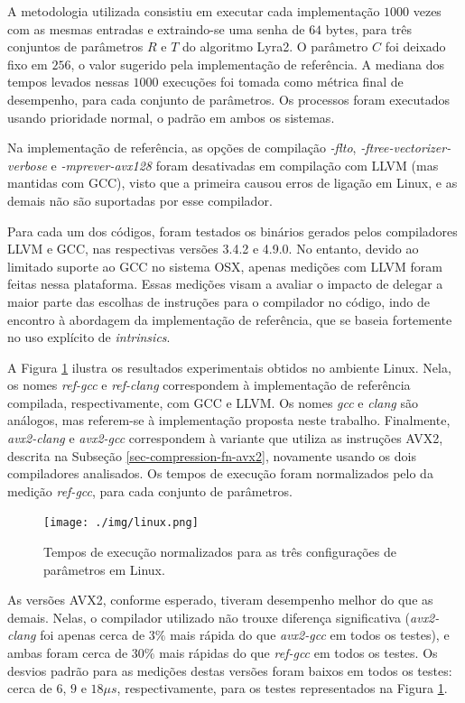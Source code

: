 \documentclass{article}
\begin{document}
A metodologia utilizada consistiu em executar cada implementação
$1000$ vezes com as mesmas entradas e extraindo-se uma senha de $64$
bytes, para três conjuntos de parâmetros $R$ e $T$ do algoritmo
Lyra2. O parâmetro $C$ foi deixado fixo em $256$, o valor sugerido
pela implementação de referência. A mediana dos tempos levados nessas
$1000$ execuções foi tomada como métrica final de desempenho, para
cada conjunto de parâmetros. Os processos foram executados usando
prioridade normal, o padrão em ambos os sistemas.

Na implementação de referência, as opções de compilação \emph{-flto},
\emph{-ftree-vectorizer-verbose} e \emph{-mprever-avx128} foram desativadas em
compilação com LLVM (mas mantidas com GCC), visto que a primeira causou erros
de ligação em Linux, e as demais não são suportadas por esse compilador.

Para cada um dos códigos, foram testados os binários gerados pelos
compiladores LLVM e GCC, nas respectivas versões 3.4.2 e 4.9.0. No
entanto, devido ao limitado suporte ao GCC no sistema OSX, apenas
medições com LLVM foram feitas nessa plataforma. Essas medições visam a
avaliar o impacto de delegar a maior parte das escolhas de instruções
para o compilador no código, indo de encontro à abordagem da
implementação de referência, que se baseia fortemente no uso explícito
de \emph{intrinsics}.

A Figura \ref{results-linux} ilustra os resultados experimentais obtidos
no ambiente Linux. Nela, os nomes \emph{ref-gcc} e \emph{ref-clang}
correspondem à implementação de referência compilada, respectivamente,
com GCC e LLVM. Os nomes \emph{gcc} e \emph{clang} são análogos, mas
referem-se à implementação proposta neste trabalho. Finalmente,
\emph{avx2-clang} e \emph{avx2-gcc} correspondem à variante que utiliza
as instruções AVX2, descrita na Subseção \ref{sec-compression-fn-avx2},
novamente usando os dois compiladores analisados. Os tempos de execução
foram normalizados pelo da medição \emph{ref-gcc}, para cada conjunto de
parâmetros.

\begin{figure}[htbp]
\centering
\texttt{[image: ./img/linux.png]}
\caption{Tempos de execução normalizados para as três configurações de parâmetros em Linux\label{results-linux}.}
\end{figure}

As versões AVX2, conforme esperado, tiveram desempenho melhor do que as
demais. Nelas, o compilador utilizado não trouxe diferença significativa
(\emph{avx2-clang} foi apenas cerca de $3\%$ mais rápida do que
\emph{avx2-gcc} em todos os testes), e ambas foram cerca de $30\%$
mais rápidas do que \emph{ref-gcc} em todos os testes. Os desvios padrão
para as medições destas versões foram baixos em todos os testes: cerca de $6$,
$9$ e $18 \mu s$, respectivamente, para os testes representados na Figura
\ref{results-linux}.
\end{document}

